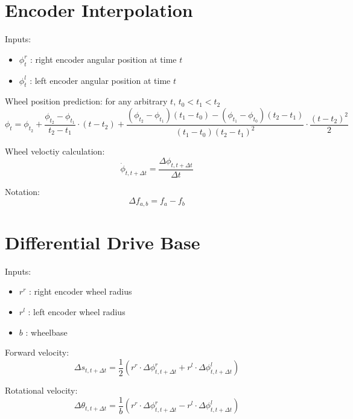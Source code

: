 \documentclass[a4paper]{article}
\begin{document}
\section{Encoder Interpolation}

Inputs:
\begin{itemize}
\item $\phi_t^r$ : right encoder angular position at time $t$
\item $\phi_t^l$ : left encoder angular position at time $t$
\end{itemize}

Wheel position prediction: for any arbitrary $t$, $t_0 < t_1 < t_2$
\begin{equation}
	\phi_t = \phi_{t_2} + \frac{\phi_{t_2} - \phi_{t_1}}{t_2 - t_1} \cdot (t - t_2) + \frac{(\phi_{t_2} - \phi_{t_1})(t_1 - t_0) - (\phi_{t_1} - \phi_{t_0})(t_2 - t_1)}{(t_1 - t_0)(t_2 - t_1)^2} \cdot \frac{(t - t_2)^2}{2}
\end{equation}

Wheel veloctiy calculation:
\begin{equation}
    \dot\phi_{t,t+\Delta t} = \frac{\Delta \phi_{t,t+\Delta t}}{\Delta t}
\end{equation}

Notation:
\begin{equation}
    \Delta f_{a,b} = f_a - f_b
\end{equation}


\section{Differential Drive Base}

Inputs:
\begin{itemize}
\item $r^r$ : right encoder wheel radius
\item $r^l$ : left encoder wheel radius
\item $b$ : wheelbase
\end{itemize}

Forward velocity:
\begin{equation}
    \Delta s_{t,t+\Delta t} = \frac{1}{2} (r^r \cdot \Delta \phi_{t,t+\Delta t}^r + r^l \cdot \Delta \phi_{t,t+\Delta t}^l)
\end{equation}

Rotational velocity:
\begin{equation}
    \Delta \theta_{t,t+\Delta t}  = \frac{1}{b} (r^r \cdot \Delta \phi_{t,t+\Delta t}^r - r^l \cdot \Delta \phi_{t,t+\Delta t}^l)
\end{equation}
\end{document}

